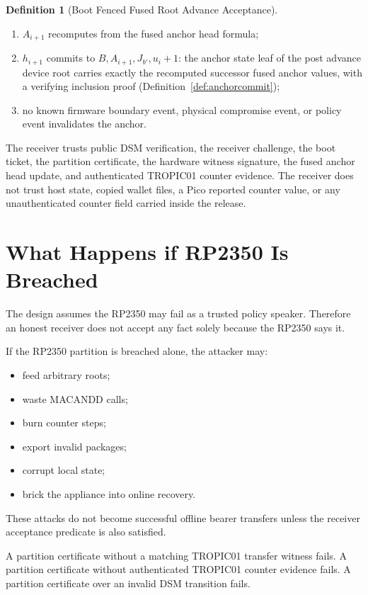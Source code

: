 \documentclass[11pt]{article}
\theoremstyle{definition}
\newtheorem{definition}[theorem]{Definition}
\theoremstyle{remark}
\newcommand{\Bundle}{\ensuremath{B}}
\newcommand{\Ahead}{\ensuremath{A}}
\newcommand{\Bhead}{\ensuremath{J}}
\begin{document}
\begin{definition}[Boot Fenced Fused Root Advance Acceptance]
\begin{enumerate}[label=(\arabic*),leftmargin=2em]
\[
u_{\mathrm{attested}}=H_0-H_{\mathrm{attested}}
\]
and verifies
\[
u_{\mathrm{attested}}=u_i+1;
\]
\item \(\Ahead_{i+1}\) recomputes from the fused anchor head formula;
\item \(h_{i+1}\) commits to \(\Bundle,\Ahead_{i+1},\Bhead_{b'},u_i+1\): the anchor state leaf
of the post advance device root carries exactly the recomputed successor fused anchor values,
with a verifying inclusion proof (Definition~\ref{def:anchorcommit});
\item no known firmware boundary event, physical compromise event, or policy event invalidates
the anchor.
\end{enumerate}
\end{definition}

The receiver trusts public DSM verification, the receiver challenge, the boot ticket, the partition
certificate, the hardware witness signature, the fused anchor head update, and authenticated
TROPIC01 counter evidence. The receiver does not trust host state, copied wallet files, a Pico
reported counter value, or any unauthenticated counter field carried inside the release.

\section{What Happens if RP2350 Is Breached}

The design assumes the RP2350 may fail as a trusted policy speaker. Therefore an honest receiver
does not accept any fact solely because the RP2350 says it.

If the RP2350 partition is breached alone, the attacker may:

\begin{itemize}
\item feed arbitrary roots;
\item waste MACANDD calls;
\item burn counter steps;
\item export invalid packages;
\item corrupt local state;
\item brick the appliance into online recovery.
\end{itemize}

These attacks do not become successful offline bearer transfers unless the receiver acceptance
predicate is also satisfied.

A partition certificate without a matching TROPIC01 transfer witness fails. A partition certificate
without authenticated TROPIC01 counter evidence fails. A partition certificate over an invalid DSM
transition fails.
\end{document}
